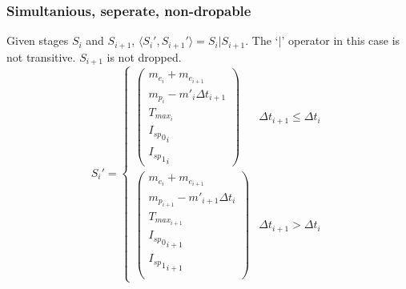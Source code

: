 \subsubsection{Simultanious, seperate, non-dropable}
Given stages $S_{i}$ and $S_{i+1}$, $\langle S_{i}', S_{i+1}' \rangle = S_{i} | S_{i+1}$.
The `$|$' operator in this case is not transitive.
$S_{i+1}$ is not dropped.
\begin{equation}
    S_{i}' =
        \begin{cases}
            \begin{pmatrix}
                m_{e_{i}} + m_{e_{i+1}} \\
                m_{p_{i}} - {m'}_{i}{\Delta{}t}_{i+1} \\
                T_{max_{i}} \\
                {{I_{sp}}_{0}}_i \\
                {{I_{sp}}_{1}}_i
            \end{pmatrix} &
            {\Delta{}t}_{i+1} \leq {\Delta{}t}_{i} \\
            \begin{pmatrix}
                m_{e_{i}} + m_{e_{i+1}} \\
                m_{p_{i+1}} - {m'}_{i+1}{\Delta{}t}_{i} \\
                T_{max_{i+1}} \\
                {{I_{sp}}_{0}}_{i+1} \\
                {{I_{sp}}_{1}}_{i+1} \\
            \end{pmatrix} &
            {\Delta{}t}_{i+1} > {\Delta{}t}_{i}
        \end{cases}
\end{equation}
